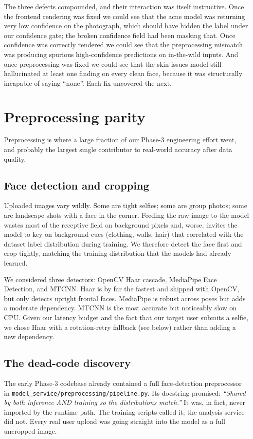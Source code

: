\documentclass[11pt,a4paper,oneside]{report}
\begin{document}
The three defects compounded, and their interaction was itself
instructive. Once the frontend rendering was fixed we could see
that the acne model was returning very low confidence on the
photograph, which should have hidden the label under our
confidence gate; the broken confidence field had been masking
that. Once confidence was correctly rendered we could see that
the preprocessing mismatch was producing spurious high-confidence
predictions on in-the-wild inputs. And once preprocessing was
fixed we could see that the skin-issues model still hallucinated
at least one finding on every clean face, because it was
structurally incapable of saying ``none''. Each fix uncovered the
next.

\section{Preprocessing parity}\label{sec:preprocessing}

Preprocessing is where a large fraction of our Phase-3 engineering
effort went, and probably the largest single contributor to
real-world accuracy after data quality.

\subsection{Face detection and cropping}
Uploaded images vary wildly. Some are tight selfies; some are group
photos; some are landscape shots with a face in the corner. Feeding
the raw image to the model wastes most of the receptive field on
background pixels and, worse, invites the model to key on
background cues (clothing, walls, hair) that correlated with the
dataset label distribution during training. We therefore detect
the face first and crop tightly, matching the training distribution
that the models had already learned.

We considered three detectors: OpenCV Haar cascade, MediaPipe Face
Detection, and MTCNN. Haar is by far the fastest and shipped with
OpenCV, but only detects upright frontal faces. MediaPipe is
robust across poses but adds a moderate dependency. MTCNN is the
most accurate but noticeably slow on CPU. Given our latency budget
and the fact that our target user submits a selfie, we chose Haar
with a rotation-retry fallback (see below) rather than adding a
new dependency.

\subsection{The dead-code discovery}
The early Phase-3 codebase already contained a full face-detection
preprocessor in \texttt{model\_service/preprocessing/pipeline.py}.
Its docstring promised: \emph{``Shared by both inference AND
training so the distributions match.''} It was, in fact, never
imported by the runtime path. The training scripts called it; the
analysis service did not. Every real user upload was going
straight into the model as a full uncropped image.
\end{document}
